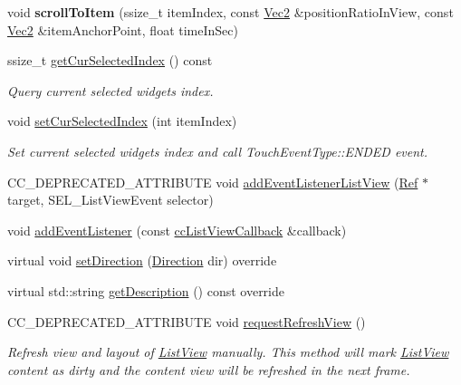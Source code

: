 \begin{DoxyCompactItemize}
\mbox{\label{classui_1_1ListView_a7655f58119a990d51921f7b453bac14f}} 
void {\bfseries scroll\+To\+Item} (ssize\+\_\+t item\+Index, const \hyperlink{classVec2}{Vec2} \&position\+Ratio\+In\+View, const \hyperlink{classVec2}{Vec2} \&item\+Anchor\+Point, float time\+In\+Sec)
\item 
ssize\+\_\+t \hyperlink{classui_1_1ListView_a6efee3d32e83e99b248afd96dfbfef94}{get\+Cur\+Selected\+Index} () const
\begin{DoxyCompactList}\small\item\em Query current selected widget\textquotesingle{}s index. \end{DoxyCompactList}\item 
void \hyperlink{classui_1_1ListView_a087e340d27a4f774c63b5b8dadd4206a}{set\+Cur\+Selected\+Index} (int item\+Index)
\begin{DoxyCompactList}\small\item\em Set current selected widget\textquotesingle{}s index and call Touch\+Event\+Type\+::\+E\+N\+D\+ED event. \end{DoxyCompactList}\item 
C\+C\+\_\+\+D\+E\+P\+R\+E\+C\+A\+T\+E\+D\+\_\+\+A\+T\+T\+R\+I\+B\+U\+TE void \hyperlink{classui_1_1ListView_a556eebb13ecb5dd706023857477c4b46}{add\+Event\+Listener\+List\+View} (\hyperlink{classRef}{Ref} $\ast$target, S\+E\+L\+\_\+\+List\+View\+Event selector)
\item 
void \hyperlink{classui_1_1ListView_ac9579703c37e0c23eba035fe31e00ba5}{add\+Event\+Listener} (const \hyperlink{classui_1_1ListView_ac67b2dd17d792bb61a9020b3935ffc79}{cc\+List\+View\+Callback} \&callback)
\item 
virtual void \hyperlink{classui_1_1ListView_aaac3381602537a823529058b64bffabf}{set\+Direction} (\hyperlink{classui_1_1ScrollView_aed2d778ae8098dcafe323b2beae8dd6b}{Direction} dir) override
\item 
virtual std\+::string \hyperlink{classui_1_1ListView_a653bb454095ef227949f7c791b68180c}{get\+Description} () const override
\item 
C\+C\+\_\+\+D\+E\+P\+R\+E\+C\+A\+T\+E\+D\+\_\+\+A\+T\+T\+R\+I\+B\+U\+TE void \hyperlink{classui_1_1ListView_a4c022c87acd7ba5ddaaae7a3f0dac170}{request\+Refresh\+View} ()
\begin{DoxyCompactList}\small\item\em Refresh view and layout of \hyperlink{classui_1_1ListView}{List\+View} manually. This method will mark \hyperlink{classui_1_1ListView}{List\+View} content as dirty and the content view will be refreshed in the next frame. \end{DoxyCompactList}\item 

\end{DoxyCompactItemize}
